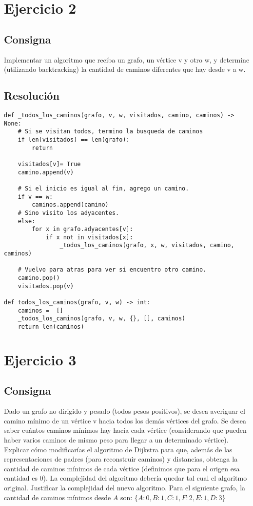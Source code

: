 \documentclass{article}
\begin{document}
\section*{Ejercicio 2}

\subsection*{Consigna}

Implementar un algoritmo que reciba un grafo, un vértice v y otro w, y determine (utilizando backtracking) la cantidad
de caminos diferentes que hay desde v a w.

\subsection*{Resolución}

\begin{lstlisting}[frame=single]
def _todos_los_caminos(grafo, v, w, visitados, camino, caminos) -> None:
    # Si se visitan todos, termino la busqueda de caminos
    if len(visitados) == len(grafo):
        return

    visitados[v]= True
    camino.append(v) 

    # Si el inicio es igual al fin, agrego un camino.
    if v == w: 
        caminos.append(camino)
    # Sino visito los adyacentes.
    else:
        for x in grafo.adyacentes[v]: 
            if x not in visitados[x]: 
                _todos_los_caminos(grafo, x, w, visitados, camino, caminos)

    # Vuelvo para atras para ver si encuentro otro camino.
    camino.pop() 
    visitados.pop(v)

def todos_los_caminos(grafo, v, w) -> int:
    caminos =  []
    _todos_los_caminos(grafo, v, w, {}, [], caminos)
    return len(caminos)
\end{lstlisting}

\section*{Ejercicio 3}

\subsection*{Consigna}
Dado un grafo no dirigido y pesado (todos pesos positivos), se desea averiguar el camino mínimo de un vértice v hacia todos
los demás vértices del grafo. Se desea saber cuántos caminos mínimos hay hacia cada vértice (considerando que pueden
haber varios caminos de mismo peso para llegar a un determinado vértice). Explicar cómo modificarías el algoritmo de
Dijkstra para que, además de las representaciones de padres (para reconstruir caminos) y distancias, obtenga la cantidad de
caminos mínimos de cada vértice (definimos que para el origen esa cantidad es 0). La complejidad del algoritmo debería
quedar tal cual el algoritmo original. Justificar la complejidad del nuevo algoritmo. Para el siguiente grafo, la cantidad de
caminos mínimos desde $A$ son: $\{A: 0, B: 1, C: 1, F: 2, E: 1, D: 3\}$
\end{document}
